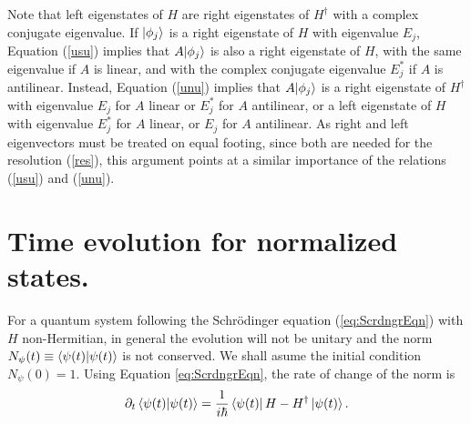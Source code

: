 Note that left eigenstates of $H$ are right eigenstates of $H^\dagger$
with a complex conjugate eigenvalue. If $|\phi_j\rangle$ is  a right eigenstate of $H$
with eigenvalue $E_j$, Equation (\ref{usu}) implies that
$A|\phi_j\rangle$ is also a right  eigenstate of $H$, with the
same eigenvalue if $A$ is linear, and with the complex conjugate eigenvalue $E_j^*$ if $A$ is antilinear.
Instead, Equation (\ref{unu}) implies that $A|\phi_j\rangle$ is a right eigenstate of $H^\dagger$
with eigenvalue $E_j$ for $A$ linear or $E_j^*$ for $A$ antilinear, or a left eigenstate of $H$ with eigenvalue
$E_j^*$ for $A$ linear, or $E_j$ for $A$ antilinear.
As right and left eigenvectors must be treated on equal footing, since both are needed for the
resolution (\ref{res}), this argument points at a similar importance of the relations (\ref{usu}) and (\ref{unu}).
%
%
%
%
\section{Time evolution for normalized states.}
%
%
For a quantum system following the  Schr\"odinger equation (\ref{eq:ScrdngrEqn})
%
%
with $H$ non-Hermitian, in general the evolution will not  be unitary and
the norm $N_{\psi}(t) \equiv \braket{\psi(t)}{\psi(t)}$ is not conserved.
%
%
We shall asume the initial condition $N_{\psi}(0)=1$. Using Equation \eqref{eq:ScrdngrEqn},
the rate of change of the norm is
%
\begin{equation}
    \partial_t \braket{\psi(t)}{\psi(t)} = \frac{1}{i\hbar}\bra{\psi(t)}H-H^\dagger\ket{\psi(t)}.
    \label{eq:NormChange}
\end{equation}
%
%
%
